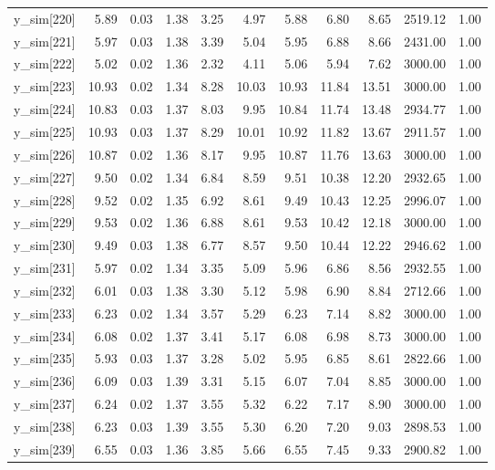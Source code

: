 \begin{table}[ht]
\begin{tabular}{rrrrrrrrrrr}
  y\_sim[220] & 5.89 & 0.03 & 1.38 & 3.25 & 4.97 & 5.88 & 6.80 & 8.65 & 2519.12 & 1.00 \\ 
  y\_sim[221] & 5.97 & 0.03 & 1.38 & 3.39 & 5.04 & 5.95 & 6.88 & 8.66 & 2431.00 & 1.00 \\ 
  y\_sim[222] & 5.02 & 0.02 & 1.36 & 2.32 & 4.11 & 5.06 & 5.94 & 7.62 & 3000.00 & 1.00 \\ 
  y\_sim[223] & 10.93 & 0.02 & 1.34 & 8.28 & 10.03 & 10.93 & 11.84 & 13.51 & 3000.00 & 1.00 \\ 
  y\_sim[224] & 10.83 & 0.03 & 1.37 & 8.03 & 9.95 & 10.84 & 11.74 & 13.48 & 2934.77 & 1.00 \\ 
  y\_sim[225] & 10.93 & 0.03 & 1.37 & 8.29 & 10.01 & 10.92 & 11.82 & 13.67 & 2911.57 & 1.00 \\ 
  y\_sim[226] & 10.87 & 0.02 & 1.36 & 8.17 & 9.95 & 10.87 & 11.76 & 13.63 & 3000.00 & 1.00 \\ 
  y\_sim[227] & 9.50 & 0.02 & 1.34 & 6.84 & 8.59 & 9.51 & 10.38 & 12.20 & 2932.65 & 1.00 \\ 
  y\_sim[228] & 9.52 & 0.02 & 1.35 & 6.92 & 8.61 & 9.49 & 10.43 & 12.25 & 2996.07 & 1.00 \\ 
  y\_sim[229] & 9.53 & 0.02 & 1.36 & 6.88 & 8.61 & 9.53 & 10.42 & 12.18 & 3000.00 & 1.00 \\ 
  y\_sim[230] & 9.49 & 0.03 & 1.38 & 6.77 & 8.57 & 9.50 & 10.44 & 12.22 & 2946.62 & 1.00 \\ 
  y\_sim[231] & 5.97 & 0.02 & 1.34 & 3.35 & 5.09 & 5.96 & 6.86 & 8.56 & 2932.55 & 1.00 \\ 
  y\_sim[232] & 6.01 & 0.03 & 1.38 & 3.30 & 5.12 & 5.98 & 6.90 & 8.84 & 2712.66 & 1.00 \\ 
  y\_sim[233] & 6.23 & 0.02 & 1.34 & 3.57 & 5.29 & 6.23 & 7.14 & 8.82 & 3000.00 & 1.00 \\ 
  y\_sim[234] & 6.08 & 0.02 & 1.37 & 3.41 & 5.17 & 6.08 & 6.98 & 8.73 & 3000.00 & 1.00 \\ 
  y\_sim[235] & 5.93 & 0.03 & 1.37 & 3.28 & 5.02 & 5.95 & 6.85 & 8.61 & 2822.66 & 1.00 \\ 
  y\_sim[236] & 6.09 & 0.03 & 1.39 & 3.31 & 5.15 & 6.07 & 7.04 & 8.85 & 3000.00 & 1.00 \\ 
  y\_sim[237] & 6.24 & 0.02 & 1.37 & 3.55 & 5.32 & 6.22 & 7.17 & 8.90 & 3000.00 & 1.00 \\ 
  y\_sim[238] & 6.23 & 0.03 & 1.39 & 3.55 & 5.30 & 6.20 & 7.20 & 9.03 & 2898.53 & 1.00 \\ 
  y\_sim[239] & 6.55 & 0.03 & 1.36 & 3.85 & 5.66 & 6.55 & 7.45 & 9.33 & 2900.82 & 1.00 \\ 

\end{tabular}
\end{table}
